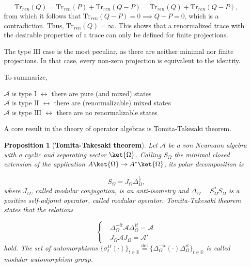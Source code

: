 \documentclass[a4paper,11pt]{article}
\newcommand{\eqdef}{\overset{\mathrm{def}}{=}}
\newtheorem{Proposition}{Proposition}[subsection]
\begin{document}
\begin{equation}
    \mathrm{Tr}_{ren} (Q) = \mathrm{Tr}_{ren} (P) + \mathrm{Tr}_{ren} (Q - P) = \mathrm{Tr}_{ren} (Q) + \mathrm{Tr}_{ren}(Q - P) \text{,}
\end{equation}
%
from which it follows that $\mathrm{Tr}_{ren}(Q - P) = 0 \implies Q - P = 0$, which is a contradiction. Thus, $\mathrm{Tr}_{ren} (Q) = \infty$. This shows that a renormalized trace with the desirable properties of a trace can only be defined for finite projections.

The type $\mathrm{III}$ case is the most peculiar, as there are neither minimal nor finite projections. In that case, every non-zero projection is equivalent to the identity.

To summarize,

\begin{center}
    $\mathcal{A}$ is type $\mathrm{I}$ $\longleftrightarrow$ there are \textnormal{pure} (and mixed) \textnormal{states} \\
    $\mathcal{A}$ is type $\mathrm{II}$ $\longleftrightarrow$ there are (renormalizable) \textnormal{mixed states} \\
    $\mathcal{A}$ is type $\mathrm{III}$ $\longleftrightarrow$ there are \textnormal{no renormalizable states}
\end{center}
%
A core result in the theory of operator algebras is Tomita-Takesaki theorem.

\begin{Proposition}[\textbf{Tomita-Takesaki theorem}]
    Let $\mathcal{A}$ be a von Neumann algebra with a cyclic and separating vector $\ket{\Omega}$. Calling $S_{\Omega}$ the minimal closed extension of the application $A \ket{\Omega} \rightarrow A^* \ket{\Omega}$, its polar decomposition is
    
    \begin{equation}
        S_{\Omega} = J_{\Omega} \Delta_{\Omega}^{\frac{1}{2}} \text{,}
    \end{equation}
    where $J_{\Omega}$, called \textnormal{modular conjugation}, is an anti-isometry and $\Delta_{\Omega} = S_{\Omega}^* S_{\Omega}$ is a positive self-adjoint operator, called \textnormal{modular operator}. Tomita-Takesaki theorem states that the relations
    
    \begin{equation}
        \begin{cases}
            &\Delta_{\Omega}^{-it} \mathcal{A} \Delta_{\Omega}^{it} = \mathcal{A} \\
            &J_{\Omega} \mathcal{A} J_{\Omega} = \mathcal{A}'
        \end{cases}
    \end{equation}
    hold. The set of automorphisms $\{ \sigma_t^{\Omega} (\cdot) \}_{t \in \mathbb{R}} \eqdef \{ \Delta_{\Omega}^{-it} (\cdot) \Delta_{\Omega}^{it} \}_{t \in \mathbb{R}}$ is called \textnormal{modular automorphism group}.
    \label{Tomita-Takesaki}
\end{Proposition}
\end{document}
